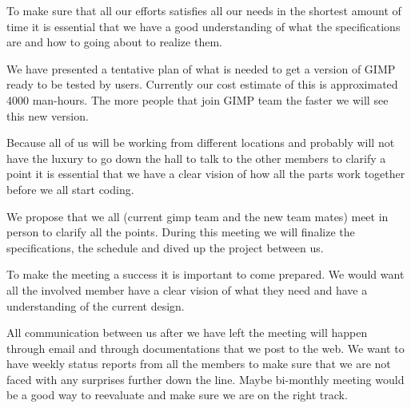 To make sure that all our efforts satisfies all our needs in the shortest amount of time it is essential that we have a good understanding of what the specifications are and how to going about to realize them. 

We have presented a tentative plan of what is needed to get a version of GIMP ready to be tested by users. Currently our cost estimate of this is approximated 4000 man-hours. The more people that join GIMP team the faster we will see this new version.

Because all of us will be working from different locations and probably will not have the luxury to go down the hall to talk to the other members to clarify a point it is essential that we have a clear vision of how all the parts work together before we all start coding.

We propose that we all (current gimp team and the new team mates) meet in person to clarify all the points. During this meeting we will finalize the specifications, the schedule and dived up the project between us.

To make the meeting a success it is important to come prepared. We would want all the involved member have a clear vision of what they need and have a understanding of the current design. 

All communication between us after we have left the meeting will happen through email and through documentations that we post to the web. We want to have weekly status reports from all the members to make sure that we are not faced with any surprises further down the line. Maybe bi-monthly meeting would be a good way to reevaluate and make sure we are on the right track.
 
 




